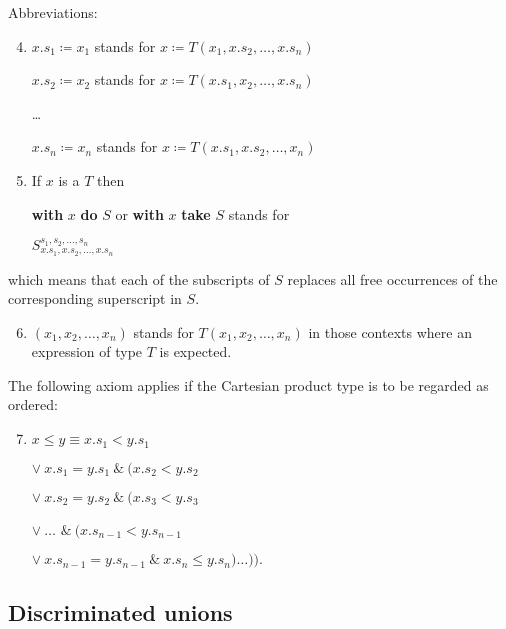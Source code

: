 \noindent
Abbreviations:

\begin{enumerate}[leftmargin=2\parindent, label=(\arabic*)]
	\setcounter{enumi}{3}
	\item $x.s_1 \coloneq x_1$ stands for $x\coloneq T(x_1, x.s_2, \dots, x.s_n)$

	$x.s_2 \coloneq x_2$ stands for $x\coloneq T(x.s_1, x_2, \dots, x.s_n)$

	\qquad \dots

	$x.s_n \coloneq x_n$ stands for $x\coloneq T(x.s_1, x.s_2, \dots, x_n)$

	\item If $x$ is a $T$ then
	
	\textbf{with} $x$ \textbf{do} $S$ or \textbf{with} $x$ \textbf{take} $S$ stands for
	
	\quad $S_{x.s_1, x.s_2, \dots, x.s_n}^{s_1, s_2, \dots, s_n}$
\end{enumerate}

\noindent
which means that each of the subscripts of $S$ replaces all free occurrences of the corresponding superscript in $S$.

\begin{enumerate}[leftmargin=2\parindent, label=(\arabic*)]
	\setcounter{enumi}{5}
	\item $(x_1, x_2, \dots, x_n)$ stands for $T(x_1, x_2, \dots, x_n)$ in those contexts where an expression of type $T$ is expected.
\end{enumerate}

The following axiom applies if the Cartesian product type is to be regarded as ordered:
	
\begin{enumerate}[leftmargin=2\parindent, label=(\arabic*)]
	\setcounter{enumi}{6}
	\item $x \leqslant y \equiv$\quad $x.s_1 < y.s_1$
		
	\tabto*{3.2em}$\vee\ x.s_1 = y.s_1\ \&\ (x.s_2 < y.s_2$
	
	\tabto*{3.2em}$\vee\ x.s_2 = y.s_2\ \&\ (x.s_3 < y.s_3$
	
	\tabto*{3.2em}$\vee\ \dots$ \tabto*{8.6em}$\&\ (x.s_{n - 1} < y.s_{n-1}$
	
	\tabto*{3.2em}$\vee\ x.s_{n-1} = y.s_{n-1}\ \&\ x.s_n \leqslant y.s_n)\dots)).$
\end{enumerate}

\subsection{Discriminated unions}

